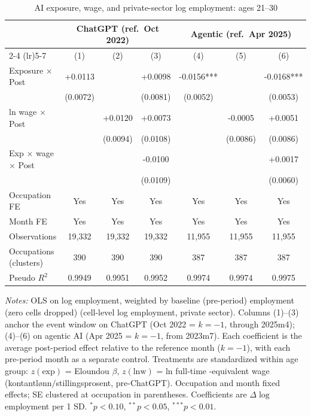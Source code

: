 \begin{table}[htbp]\centering
\caption{AI exposure, wage, and private-sector log employment: ages 21–30}
\label{tab:ca_did_age1}
\small
\begin{tabular}{lcccccc}
\toprule
 & \multicolumn{3}{c}{ChatGPT (ref.\ Oct 2022)} & \multicolumn{3}{c}{Agentic (ref.\ Apr 2025)} \\
\cmidrule(lr){2-4} \cmidrule(lr){5-7}
 & (1) & (2) & (3) & (4) & (5) & (6) \\
\midrule
Exposure $\times$ Post & +0.0113 &  & +0.0098 & -0.0156*** &  & -0.0168*** \\
 & (0.0072) &  & (0.0081) & (0.0052) &  & (0.0053) \\
ln wage $\times$ Post &  & +0.0120 & +0.0073 &  & -0.0005 & +0.0051 \\
 &  & (0.0094) & (0.0108) &  & (0.0086) & (0.0086) \\
Exp $\times$ wage $\times$ Post &  &  & -0.0100 &  &  & +0.0017 \\
 &  &  & (0.0109) &  &  & (0.0060) \\
\midrule
Occupation FE & Yes & Yes & Yes & Yes & Yes & Yes \\
Month FE & Yes & Yes & Yes & Yes & Yes & Yes \\
Observations & 19,332 & 19,332 & 19,332 & 11,955 & 11,955 & 11,955 \\
Occupations (clusters) & 390 & 390 & 390 & 387 & 387 & 387 \\
Pseudo $R^2$ & 0.9949 & 0.9951 & 0.9952 & 0.9974 & 0.9974 & 0.9975 \\
\bottomrule
\end{tabular}
\begin{minipage}{\linewidth}\vspace{2pt}\footnotesize
\emph{Notes:} OLS on log employment, weighted by baseline (pre-period) employment (zero cells dropped) (cell-level log employment, private sector). Columns (1)--(3) anchor the event window on ChatGPT (Oct 2022 = $k{=}{-}1$, through 2025m4); (4)--(6) on agentic AI (Apr 2025 = $k{=}{-}1$, from 2023m7). Each coefficient is the average post-period effect relative to the reference month ($k{=}{-}1$), with each pre-period month as a separate control. Treatments are standardized within age group: $z(\text{exp})$ = Eloundou $\beta$, $z(\text{lnw})$ = ln full-time -equivalent wage (kontantl\o nn$/$stillingsprosent, pre-ChatGPT). Occupation and month fixed effects; SE clustered at occupation in parentheses. Coefficients are $\Delta\log$ employment per 1 SD. $^{*}p<0.10$, $^{**}p<0.05$, $^{***}p<0.01$.
\end{minipage}
\end{table}